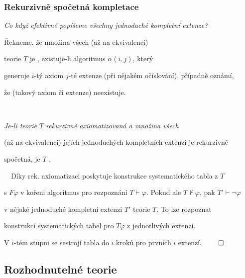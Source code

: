     
    
    \subsubsection*{Rekurzivně spočetná kompletace}
    {\it Co když efektivně popíšeme všechny jednoduché kompletní extenze?}
    \medskip
    
    \smallskip
    
    Řekneme, že množina všech (až na ekvivalenci) 
    \smallskip
    
     teorie $T$ je , existuje-li algoritmus $\alpha(i,j)$, který
    \smallskip
    
    generuje $i$-tý axiom $j$-té extenze (při nějakém očíslování), případně oznámí,
    \smallskip
    
    že (takový axiom či extenze) neexistuje.
    \medskip
    
    \smallskip
    
    {\bf {}}\ \ {\it Je-li teorie $T$ rekurzivně axiomatizovaná a množina všech
    \smallskip
    
    (až na ekvivalenci) jejích jednoduchých kompletních extenzí je rekurzivně
    \smallskip
    
    spočetná, je $T$ .}
    \medskip
    
    \smallskip
    
    {\it {}}\ \ Díky rek. axiomatizaci poskytuje konstrukce systematického tabla z $T$
    \smallskip
    
    s $F\varphi$ v kořeni algoritmus pro rozpoznání $T\vdash \varphi$. Pokud ale $T \not \vdash \varphi$, pak $T'\vdash \neg\varphi$
    \smallskip
    
    v nějaké jednoduché kompletní extenzi $T'$ teorie $T$. To lze rozpoznat 
    \smallskip
    
     konstrukcí systematických tabel pro $T\varphi$ z jednotlivých extenzí.
    \smallskip
    
    V $i$-tém stupni se sestrojí tabla do $i$ kroků pro prvních $i$ extenzí. $\qed$
    

\subsection{Rozhodnutelné teorie}\todo

